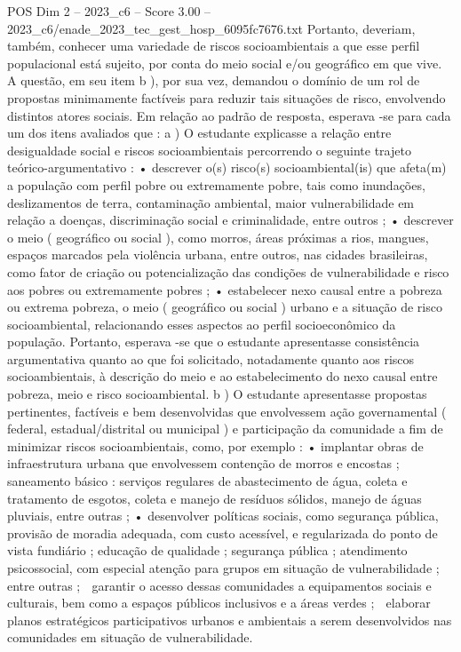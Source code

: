 \begin{textsample}{POS Dim 2 – 2023\_c6 – Score 3.00 – 2023\_c6/enade\_2023\_tec\_gest\_hosp\_6095fc7676.txt}
Portanto, deveriam, também, conhecer uma variedade de riscos socioambientais a que esse perfil populacional está sujeito, por conta do meio social e/ou geográfico em que vive.
A questão, em seu item b ), por sua vez, demandou o domínio de um rol de propostas minimamente factíveis para reduzir tais situações de risco, envolvendo distintos atores sociais.
Em relação ao padrão de resposta, esperava -se para cada um dos itens avaliados que : a ) O estudante explicasse a relação entre desigualdade social e riscos socioambientais percorrendo o seguinte trajeto teórico-argumentativo : • descrever o(s) risco(s) socioambiental(is) que afeta(m) a população com perfil pobre ou extremamente pobre, tais como inundações, deslizamentos de terra, contaminação ambiental, maior vulnerabilidade em relação a doenças, discriminação social e criminalidade, entre outros ; • descrever o meio ( geográfico ou social ), como morros, áreas próximas a rios, mangues, espaços marcados pela violência urbana, entre outros, nas cidades brasileiras, como fator de criação ou potencialização das condições de vulnerabilidade e risco aos pobres ou extremamente pobres ; • estabelecer nexo causal entre a pobreza ou extrema pobreza, o meio ( geográfico ou social ) urbano e a situação de risco socioambiental, relacionando esses aspectos ao perfil socioeconômico da população.
Portanto, esperava -se que o estudante apresentasse consistência argumentativa quanto ao que foi solicitado, notadamente quanto aos riscos socioambientais, à descrição do meio e ao estabelecimento do nexo causal entre pobreza, meio e risco socioambiental. b ) O estudante apresentasse propostas pertinentes, factíveis e bem desenvolvidas que envolvessem ação governamental ( federal, estadual/distrital ou municipal ) e participação da comunidade a fim de minimizar riscos socioambientais, como, por exemplo : • implantar obras de infraestrutura urbana que envolvessem contenção de morros e encostas ; saneamento básico : serviços regulares de abastecimento de água, coleta e tratamento de esgotos, coleta e manejo de resíduos sólidos, manejo de águas pluviais, entre outras ; • desenvolver políticas sociais, como segurança pública, provisão de moradia adequada, com custo acessível, e regularizada do ponto de vista fundiário ; educação de qualidade ; segurança pública ; atendimento psicossocial, com especial atenção para grupos em situação de vulnerabilidade ; entre outras ;  garantir o acesso dessas comunidades a equipamentos sociais e culturais, bem como a espaços públicos inclusivos e a áreas verdes ;  elaborar planos estratégicos participativos urbanos e ambientais a serem desenvolvidos nas comunidades em situação de vulnerabilidade.

\end{textsample}
